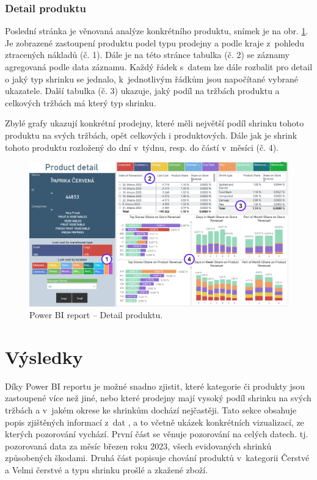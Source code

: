 \subsubsection*{Detail produktu}

Poslední stránka je věnovaná analýze konkrétního produktu, snímek je na obr. \ref*{obr:PBI:detail}. Je zobrazené zastoupení produktu podel typu prodejny a podle kraje z~pohledu ztracených nákladů (č. 1). Dále je na této stránce tabulka (č. 2) se záznamy agregovaná podle data záznamu. Každý řádek s~datem lze dále rozbalit pro detail o jaký typ shrinku se jednalo, k~jednotlivým řádkům jsou napočítané vybrané ukazatele. Další tabulka (č. 3) ukazuje, jaký podíl na tržbách produktu a celkových tržbách má který typ shrinku. 

Zbylé grafy ukazují konkrétní prodejny, které měli největší podíl shrinku tohoto produktu na svých tržbách, opět celkových i produktových. Dále jak je shrink tohoto produktu rozložený do dní v~týdnu, resp. do částí v~měsíci (č. 4).

\begin{figure}[h!]
    \centering
    \captionsetup{justification=centering}
    \includegraphics[width=\textwidth]{obrazky/PBI/productdetail.png}
    \caption{Power BI report -- Detail produktu.}
    \label{obr:PBI:detail}
\end{figure}

\section{Výsledky}
\label{sec:vizualizace:vysl}

Díky Power BI reportu je možné snadno zjistit, které kategorie či produkty jsou zastoupené více než jiné, nebo které prodejny mají vysoký podíl shrinku na svých tržbách a v~jakém okrese ke shrinkům dochází nejčastěji. Tato sekce obsahuje popis zjištěných informací z~dat , a to včetně ukázek konkrétních vizualizací, ze kterých pozorování vychází.
První část se věnuje pozorování na celých datech. tj. pozorovaná data za měsíc březen roku 2023, všech evidovaných shrinků způsobených škodami. Druhá část popisuje chování produktů v~kategorii Čerstvé a Velmi čerstvé a typu shrinku prošlé a zkažené zboží.

